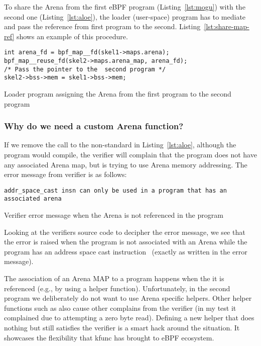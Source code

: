 \documentclass{article} \usepackage{graphicx}
\begin{document}
To share the Arena from the first eBPF program (Listing~\ref{lst:mogu})
with the second one (Listing~\ref{lst:aloe}), the loader (user-space) program
has to mediate and pass the reference from first program to the second.
Listing~\ref{lst:share-map-ref} shows an example of this procedure.

\begin{listing}
\begin{verbatim}
int arena_fd = bpf_map__fd(skel1->maps.arena);
bpf_map__reuse_fd(skel2->maps.arena_map, arena_fd);
/* Pass the pointer to the  second program */
skel2->bss->mem = skel1->bss->mem;
\end{verbatim}
\caption{Loader program assigning the Arena from the first program to the second program}
\label{lst:share-map-ref}
\end{listing}

\subsubsection{Why do we need a custom Arena function?}
\label{sec:need_custom}
If we remove the call to the non-standard  in
Listing~\ref{lst:aloe}, although the program would compile, the verifier will
complain that the program does not have any associated Arena map, but is trying
to use Arena memory addressing. The error message from verifier is as follows:

\begin{listing}
\begin{verbatim}
addr_space_cast insn can only be used in a program that has an associated arena
\end{verbatim}
\caption{Verifier error message when the Arena is not referenced in the program}
\label{lst:verifier_err_msg}
\end{listing}

Looking at the verifiers source code to decipher the error message, we see that
the error is raised when the program is not associated with an Arena while the
program has an address space cast instruction~\cite{verifier_arena_not_set}
(exactly as written in the error message).

The association of an Arena MAP to a program happens when the it is referenced
(e.g., by using a helper function). Unfortunately, in the second program we
deliberately do not want to use Arena specific helpers. Other helper functions
such as  also cause other complains from the verifier
(in my test it complained due to attempting a zero byte read). Defining a new
helper that does nothing but still satisfies the verifier is a smart hack
around the situation. It showcases the flexibility that kfunc has brought to
eBPF ecosystem.
\end{document}
